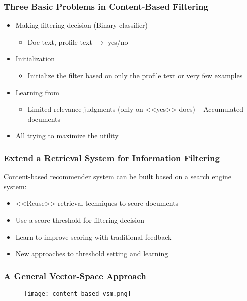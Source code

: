 \subsubsection{Three Basic Problems in Content-Based Filtering}
\begin{itemize}
\item Making filtering decision (Binary classifier) 
\begin{itemize}
\item Doc text, profile text $\to$ yes/no
\end{itemize}

\item Initialization
\begin{itemize}
\item Initialize the filter based on only the profile text or very few examples
\end{itemize}

\item Learning from
\begin{itemize}
\item Limited relevance judgments (only on <<yes>> docs) – Accumulated documents
\end{itemize}

\item All trying to maximize the utility
\end{itemize}



\subsubsection{Extend a Retrieval System for Information Filtering}
Content-based recommender system can be built based on a search engine system:
\begin{itemize}
\item <<Reuse>> retrieval techniques to score documents
\item Use a score threshold for filtering decision
\item Learn to improve scoring with traditional feedback
\item New approaches to threshold setting and learning
\end{itemize}


\subsubsection{A General Vector-Space Approach}
\begin{figure}[H]
    \centering
    \texttt{[image: content\_based\_vsm.png]}
\end{figure}



